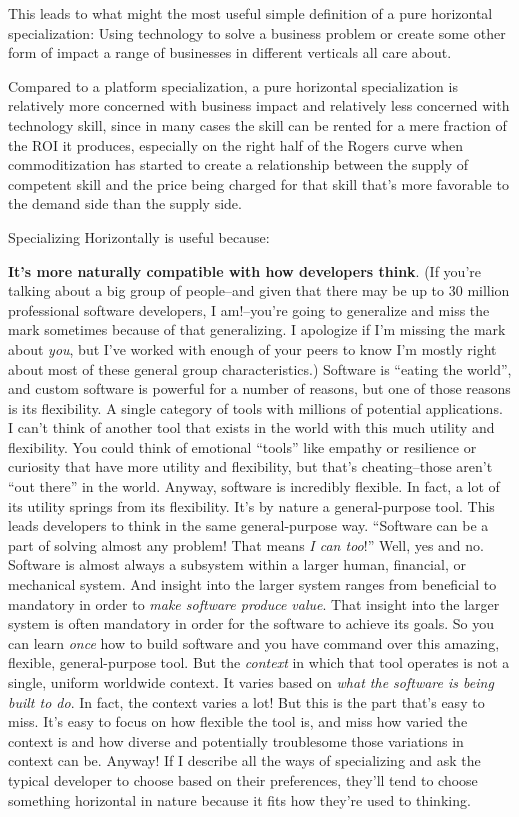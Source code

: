 This leads to what might the most useful simple definition of a pure horizontal specialization: Using technology to solve a business problem or create some other form of impact a range of businesses in different verticals all care about.

Compared to a platform specialization, a pure horizontal specialization is relatively more concerned with business impact and relatively less concerned with technology skill, since in many cases the skill can be rented for a mere fraction of the ROI it produces, especially on the right half of the Rogers curve when commoditization has started to create a relationship between the supply of competent skill and the price being charged for that skill that's more favorable to the demand side than the supply side.

Specializing Horizontally is useful because:

\textbf{It's more naturally compatible with how developers think}. (If you're talking about a big group of people--and given that there may be up to 30 million professional software developers, I am!--you're going to generalize and miss the mark sometimes because of that generalizing. I apologize if I'm missing the mark about \emph{you}, but I've worked with enough of your peers to know I'm mostly right about most of these general group characteristics.) Software is ``eating the world'', and custom software is powerful for a number of reasons, but one of those reasons is its flexibility. A single category of tools with millions of potential applications. I can't think of another tool that exists in the world with this much utility and flexibility. You could think of emotional ``tools'' like empathy or resilience or curiosity that have more utility and flexibility, but that's cheating--those aren't ``out there'' in the world. Anyway, software is incredibly flexible. In fact, a lot of its utility springs from its flexibility. It's by nature a general-purpose tool. This leads developers to think in the same general-purpose way. ``Software can be a part of solving almost any problem! That means \emph{I can too}!'' Well, yes and no. Software is almost always a subsystem within a larger human, financial, or mechanical system. And insight into the larger system ranges from beneficial to mandatory in order to \emph{make software produce value}. That insight into the larger system is often mandatory in order for the software to achieve its goals. So you can learn \emph{once} how to build software and you have command over this amazing, flexible, general-purpose tool. But the \emph{context} in which that tool operates is not a single, uniform worldwide context. It varies based on \emph{what the software is being built to do}. In fact, the context varies a lot! But this is the part that's easy to miss. It's easy to focus on how flexible the tool is, and miss how varied the context is and how diverse and potentially troublesome those variations in context can be. Anyway! If I describe all the ways of specializing and ask the typical developer to choose based on their preferences, they'll tend to choose something horizontal in nature because it fits how they're used to thinking.

